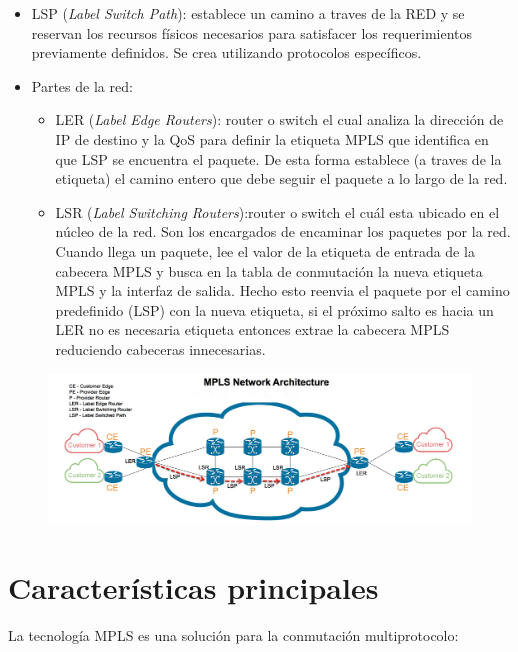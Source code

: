 \documentclass[a4paper]{article}
\begin{document}
\begin{itemize}
    \item LSP (\textit{Label Switch Path}): establece un camino a traves de la RED y se reservan los recursos físicos 
    necesarios para satisfacer los requerimientos previamente definidos. Se crea utilizando protocolos específicos.
    \item Partes de la red:
    \begin{itemize}
        \item LER (\textit{Label Edge Routers}): router o switch el cual analiza la dirección de IP de destino y la QoS para definir la 
        etiqueta MPLS que identifica en que LSP se encuentra el paquete. De esta forma establece (a traves de la etiqueta) el camino entero que debe seguir el paquete 
        a lo largo de la red.
        \item LSR (\textit{Label Switching Routers}):router o switch el cuál esta ubicado en el núcleo de la red. Son los encargados de encaminar los 
        paquetes por la red. Cuando llega un paquete, lee el valor de la etiqueta de entrada de la cabecera MPLS y busca en la tabla de conmutación la nueva etiqueta MPLS y la interfaz de salida. Hecho esto reenvia el 
        paquete por el camino predefinido (LSP) con la nueva etiqueta, si el próximo salto es hacia un LER no es necesaria etiqueta entonces extrae la cabecera MPLS reduciendo cabeceras innecesarias.
    \end{itemize}
\end{itemize}
\begin{figure}[H]
    \centering
    \includegraphics[scale=0.3]{Fig/RedMPLS}
    \caption{}
    \label{}
\end{figure}

\section{Características principales}
La tecnología MPLS es una solución para la conmutación multiprotocolo:
\end{document}
